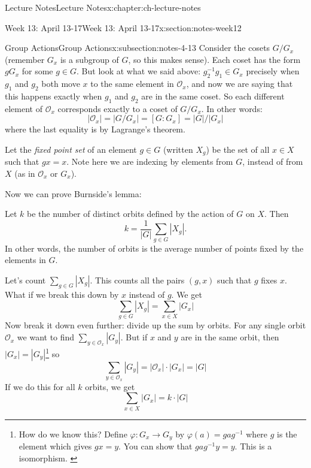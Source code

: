 \documentclass[oneside,11pt,]{book}
\begin{document}
\begin{chapterptx}{Lecture Notes}{}{Lecture Notes}{}{}{x:chapter:ch-lecture-notes}
\begin{sectionptx}{Week 13: April 13-17}{}{Week 13: April 13-17}{}{}{x:section:notes-week12}
\begin{subsectionptx}{Group Actions}{}{Group Actions}{}{}{x:subsection:notes-4-13}
Consider the cosets \(G/G_x\) (remember \(G_x\) is a subgroup of \(G\), so this makes sense). Each coset has the form \(gG_x\) for some \(g \in G\). But look at what we said above: \(g_2^{-1}g_1 \in G_x\) precisely when \(g_1\) and \(g_2\) both move \(x\) to the same element in \(\mathcal{O}_x\), and now we are saying that this happens exactly when \(g_1\) and \(g_2\) are in the same coset. So each different element of \(\mathcal{O}_x\) corresponds exactly to a coset of \(G/G_x\). In other words:%
\begin{equation*}
|\mathcal{O}_x| = |G/G_x| = [G:G_x] = |G|/|G_x|
\end{equation*}
where the last equality is by Lagrange’s theorem.%
\par
Let the \emph{fixed point set} of an element \(g \in G\) (written \(X_g\)) be the set of all \(x \in X\) such that \(gx = x\). Note here we are indexing by elements from \(G\), instead of from \(X\) (as in \(\mathcal{O}_x\) or \(G_x\)).%
\par
Now we can prove Burnside’s lemma:%
\par
Let \(k\) be the number of distinct orbits defined by the action of \(G\) on \(X\). Then%
\begin{equation*}
k = \frac{1}{|G|}\sum_{g \in G}|X_g|.
\end{equation*}
In other words, the number of orbits is the average number of points fixed by the elements in \(G\).%
\par
Let’s count \(\sum_{g\in G} |X_g|\). This counts all the pairs \((g,x)\) such that \(g\) fixes \(x\). What if we break this down by \(x\) instead of \(g\). We get%
\begin{equation*}
\sum_{g\in G} |X_g| = \sum_{x\in X} |G_x|
\end{equation*}
Now break it down even further: divide up the sum by orbits. For any single orbit \(\mathcal{O}_x\) we want to find \(\sum_{y \in \mathcal{O}_x} |G_y|\). But if \(x\) and \(y\) are in the same orbit, then \(|G_x| = |G_y|\)\footnote{How do we know this? Define \(\varphi:G_x \to G_y\) by \(\varphi(a) = gag^{-1}\) where \(g\) is the element which gives \(gx = y\). You can show that \(gag^{-1}y = y\). This is a isomorphism.%
\label{g:fn:idp189623949664}} so%
\begin{equation*}
\sum_{y \in \mathcal{O}_x} |G_y| = |\mathcal{O}_x|\cdot |G_x| = |G|
\end{equation*}
If we do this for all \(k\) orbits, we get%
\begin{equation*}
\sum_{x \in X} |G_x| = k\cdot |G|

\end{equation*}
\end{subsectionptx}
\end{sectionptx}
\end{chapterptx}
\end{document}

